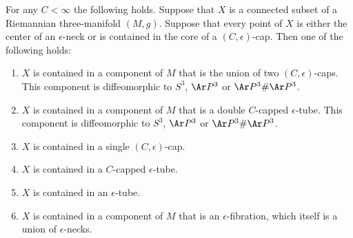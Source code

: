 \begin{proposition}
\label{prop:connected-set-in-caps-and-necks}
\label{Xcontainedin}
For any $C<\infty$ the following holds. Suppose that $X$ is a
connected subset of a Riemannian three-manifold $(M,g)$. Suppose
that every point of $X$ is either the center of an $\epsilon$-neck
or is contained in the core of a $(C,\epsilon)$-cap. Then one of the
following holds:
\begin{enumerate}
\item[(1)] $X$ is contained in a component of $M$ that is the union of
two $(C,\epsilon)$-caps. This component is diffeomorphic to $S^3$,
$\Ar P^3$ or $\Ar P^3\#\Ar P^3$.
\item[(2)] $X$ is contained in a component of $M$ that is a double $C$-capped $\epsilon$-tube.
 This component is diffeomorphic to $S^3$, $\Ar P^3$ or $\Ar
P^3\#\Ar P^3$.
\item[(3)] $X$ is contained in a single $(C,\epsilon)$-cap.
\item[(4)] $X$ is contained in a $C$-capped $\epsilon$-tube.
\item[(5)] $X$ is contained in an $\epsilon$-tube.
\item[(6)] $X$ is contained in a component of $M$ that is an
$\epsilon$-fibration, which itself is a union of $\epsilon$-necks.
\end{enumerate}
\end{proposition}


